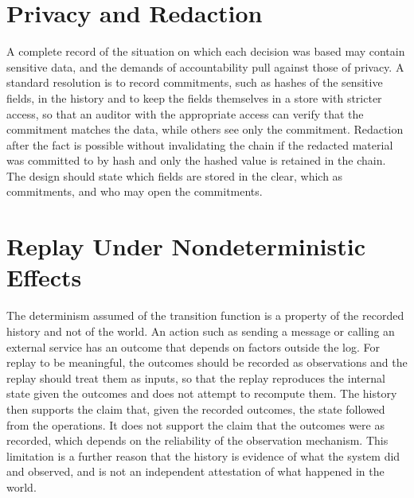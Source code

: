 \section{Privacy and Redaction}

A complete record of the situation on which each decision was based may contain sensitive data, and the demands of accountability pull against those of privacy. A standard resolution is to record commitments, such as hashes of the sensitive fields, in the history and to keep the fields themselves in a store with stricter access, so that an auditor with the appropriate access can verify that the commitment matches the data, while others see only the commitment. Redaction after the fact is possible without invalidating the chain if the redacted material was committed to by hash and only the hashed value is retained in the chain. The design should state which fields are stored in the clear, which as commitments, and who may open the commitments.

\section{Replay Under Nondeterministic Effects}

The determinism assumed of the transition function is a property of the recorded history and not of the world. An action such as sending a message or calling an external service has an outcome that depends on factors outside the log. For replay to be meaningful, the outcomes should be recorded as observations and the replay should treat them as inputs, so that the replay reproduces the internal state given the outcomes and does not attempt to recompute them. The history then supports the claim that, given the recorded outcomes, the state followed from the operations. It does not support the claim that the outcomes were as recorded, which depends on the reliability of the observation mechanism. This limitation is a further reason that the history is evidence of what the system did and observed, and is not an independent attestation of what happened in the world.
